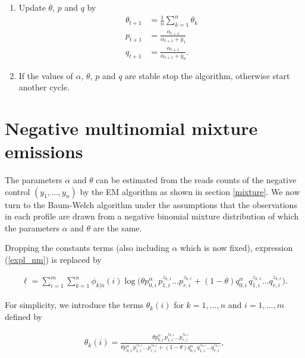 \documentclass[12pt]{article}
\begin{document}
\begin{appendices}
\begin{enumerate}
      \item Update $\theta$, $p$ and $q$ by
        \begin{align*}
        \theta_{t+1} &= \frac{1}{n}\sum_{k=1}^n\theta_k \\
        p_{t+1} &= \frac{\alpha_{t+1}} {\alpha_{t+1}+\bar{y}_1} \\
        q_{t+1} &= \frac{\alpha_{t+1}} {\alpha_{t+1}+\bar{y}_0}.
        \end{align*}

      \item If the values of $\alpha$, $\theta$, $p$ and $q$ are
      stable stop the algorithm, otherwise start another cycle.
    \end{enumerate}

    \section{Negative multinomial mixture emissions}

    The parameters $\alpha$ and $\theta$ can be estimated from the
    reads counts of the negative control $(y_1, \ldots, y_n)$ by
    the EM algorithm as shown in section \ref{mixture}. We now
    turn to the Baum-Welch algorithm under the assumptions that
    the observations in each profile are drawn from a negative
    binomial mixture distribution of which the parameters $\alpha$
    and $\theta$ are the same.

    Dropping the constants terms (also including $\alpha$ which is
    now fixed), expression (\ref{expl_nm}) is replaced by

    \begin{align*}
    \ell = \sum_{i=1}^m\sum_{k=1}^n \phi_{k|n}(i)
      \log\Big(\theta p_{0,i}^{\alpha} \, p_{1,i}^{z_{k,1}} \ldots 
      p_{r,i}^{z_{k,r}} +
      (1-\theta) q_{0,i}^{\alpha} \, q_{1,i}^{z_{k,1}} \ldots
      q_{r,i}^{z_{k,r}} \Big).
    \end{align*}

    For simplicity, we introduce the terms $\theta_k(i)$ for
    $k = 1, \ldots, n$ and $i = 1, \ldots, m$ defined by
  
    \begin{align}
    \theta_k(i) = \frac{\theta p_{0,i}^{\alpha} \, p_{1,i}^{z_{k,1}}
    \ldots p_{r,i}^{z_{k,r}}}
    {\theta p_{0,i}^{\alpha} \, p_{1,i}^{z_{k,1}}
    \ldots p_{r,i}^{z_{k,r}} + (1-\theta) q_{0,i}^{\alpha} \,
    q_{1,i}^{z_{k,1}} \ldots q_{r,i}^{z_{k,r}}},
\label{thetaki}
    \end{align}


\end{appendices}
\end{document}
